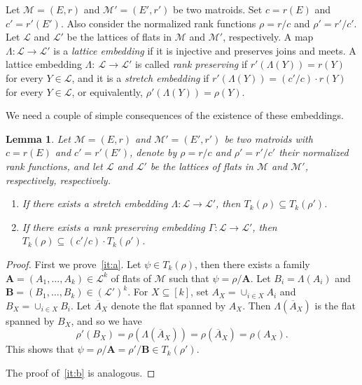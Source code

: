 \documentclass[10pt]{article}
\theoremstyle{plain}
\newtheorem{lem}[thm]{Lemma}
\theoremstyle{definition}
\newcommand{\bA}{\mathbf{A}}
\newcommand{\bB}{\mathbf{B}}
\newcommand{\LL}{\mathcal{L}}
\newcommand{\MM}{\mathcal{M}}
\begin{document}
Let $\MM=(E,r)$ and $\MM'=(E',r')$ be two matroids. Set $c=r(E)$ and $c'=r'(E')$. Also
consider the normalized rank functions $\rho=r/c$ and $\rho'=r'/c'$. Let $\LL$
and $\LL'$ be the lattices of flats in $\MM$ and $\MM'$, respectively. A
map $\Lambda\colon \LL\to\LL'$ is a {\it lattice embedding} if it is injective and
preserves joins and meets.  A lattice embedding $\Lambda: ~\LL\to\LL'$ is
called {\it rank preserving} if $r'(\Lambda(Y))=r(Y)$ for every $Y\in\LL$, and it
is a {\it stretch embedding} if $r'(\Lambda(Y))=(c'/c)\cdot r(Y)$ for every
$Y\in\LL$, or equivalently, $\rho'(\Lambda(Y))=\rho(Y)$.

We need a couple of simple consequences of the existence of these embeddings.

\begin{lem}\label{LEM:SK-DIV}
Let $\MM=(E,r)$ and $\MM'=(E',r')$ be two matroids with $c=r(E)$ and $c'=r'(E')$, denote by $\rho=r/c$ and $\rho'=r'/c'$ their normalized rank functions, and let $\LL$
and $\LL'$ be the lattices of flats in $\MM$ and $\MM'$, respectively, respectively.
\begin{enumerate}[label=(\alph*)]\itemsep0em
    \item If there exists a stretch embedding $\Lambda\colon \LL\to\LL'$, then
$T_k(\rho)\subseteq T_k(\rho')$. \label{it:a}
    \item If there exists a rank preserving embedding $\Gamma\colon \LL\to\LL'$, then $T_k(\rho)\subseteq (c'/c)\cdot T_k(\rho')$. \label{it:b}
\end{enumerate}
\end{lem}
\begin{proof}
First we prove~\ref{it:a}. Let $\psi\in T_k(\rho)$, then there exists a family
$ \bA=(A_1,\dots,A_k)\in\LL^k$ of flats of $\MM$ such that $\psi=\rho/ \bA$. Let
$B_i=\Lambda(A_i)$ and $ \bB=(B_1,\dots,B_k)\in(\LL')^k$. For $X\subseteq[k]$,
set $A_X=\cup_{i\in X} A_i$ and $B_X=\cup_{i\in X} B_i$. Let $\overline{A}_X$
denote the flat spanned by $A_X$. Then $\Lambda(\overline{A}_X)$ is the flat
spanned by $B_X$, and so we have
\[
\rho'(B_X) = \rho(\Lambda(\overline{A}_X))= \rho(\overline{A}_X)= \rho(A_X).
\]
This shows that $\psi=\rho/ \bA=\rho'/ \bB\in T_k(\rho')$. 

The proof of~\ref{it:b} is analogous.
\end{proof}
\end{document}
